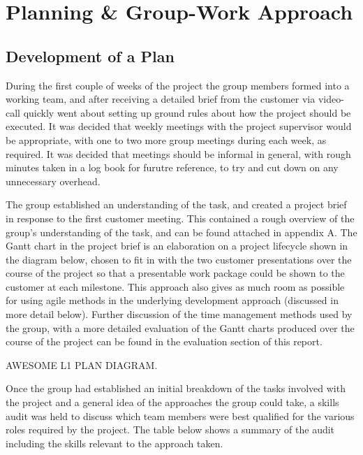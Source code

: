 \section{Planning \& Group-Work Approach}

\subsection{Development of a Plan}

During the first couple of weeks of the project the group members formed into a
working team,
and after receiving a detailed brief from the customer via video-call quickly
went about setting up ground rules about how the project should be executed. It
was decided that weekly meetings with the project supervisor would be
appropriate, with one to two more group meetings during each week, as required.
It was decided that meetings should be informal in general, with rough minutes
taken in a log book for furutre reference, to try and cut down on any unnecessary
 overhead.

The group established an understanding of the task, and created a project
brief in response to the first customer meeting. This contained a rough overview
of the group's understanding of the task, and can be found attached in appendix
A. The Gantt chart in the project brief is an elaboration on a project lifecycle
shown in the diagram below, chosen to fit in with the two customer
presentations over the course of the project so that a presentable work package
could be shown to the customer at each milestone. This approach also gives as
much room as possible
for using agile methods in the underlying development approach (discussed in
more detail below). Further discussion of the time management
methods used by the group, with a more detailed evaluation of the Gantt charts
produced over the course of the project can be found in the evaluation section
of this report.

AWESOME L1 PLAN DIAGRAM.

Once the group had established an initial breakdown of the tasks involved with the
project and a general idea of the approaches the group could take,
 a skills audit was held to discuss which team members were best
qualified for the various roles required by the project. The table below shows
a summary of the audit including the skills relevant to the approach taken.

